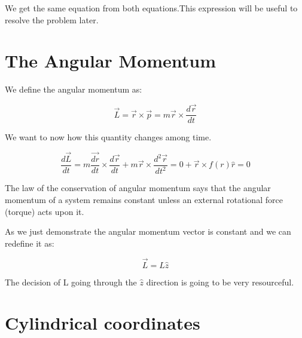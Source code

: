 
We get the same equation from both equations.This expression will be useful to resolve the problem later.

\section{The Angular Momentum}

We define the angular momentum as:

\begin{equation}
\label{ang_mom}
    \vec{L} = \vec{r} \times \vec{p} = m \vec{r} \times \frac{d\Vec{r}}{dt}
\end{equation}

We want to now how this quantity changes among time.

\begin{equation}
\label{ang_mom_dt}
    \frac{d\vec{L}}{dt} = m \frac{\vec{dr}}{dt} \times \frac{d\vec{r}}{dt} + m \vec{r} \times \frac{d^2\vec{r}}{dt^2} = 0 + \vec{r} \times f(r) \hat{r} = 0
\end{equation}

The law of the conservation of angular momentum says that the angular momentum of a system remains constant unless an external rotational force (torque) acts upon it.

As we just demonstrate the angular momentum vector is constant and we can redefine it as:

\begin{equation}
\label{ang_mom_2}
    \vec{L} = L \hat{z}
\end{equation}

The decision of L going through the $\hat{z}$ direction is going to be very resourceful.



\section{Cylindrical coordinates}

